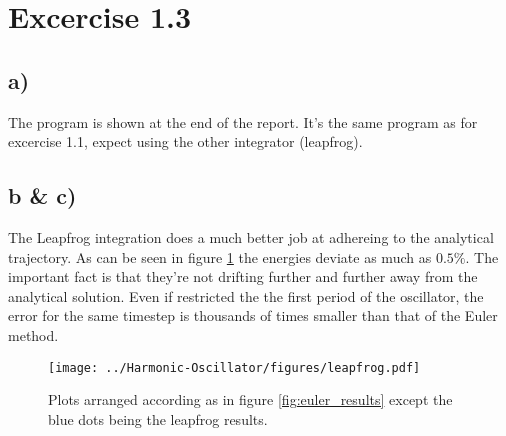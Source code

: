 \documentclass[a4paper, 12pt]{article}
\begin{document}
\section*{Excercise 1.3}

\subsection*{a)}
The program is shown at the end of the report. It's the same program as for excercise 1.1, expect using the other integrator (leapfrog).

\subsection*{b \& c)}
The Leapfrog integration does a much better job at adhereing to the analytical trajectory. As can be seen in figure \ref{fig:leapfrog_results} the energies deviate as much as $0.5\%$. The important fact is that they're not drifting further and further away from the analytical solution. Even if restricted the the first period of the oscillator, the error for the same timestep is thousands of times smaller than that of the Euler method.

\begin{figure}[h!]
    \texttt{[image: ../Harmonic-Oscillator/figures/leapfrog.pdf]}
    \caption{Plots arranged according as in figure \ref{fig:euler_results} except the blue dots being the leapfrog results.}
    \label{fig:leapfrog_results}
\end{figure}
\end{document}
